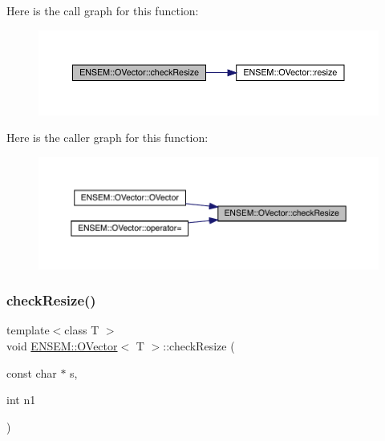 Here is the call graph for this function\+:
\nopagebreak
\begin{figure}[H]
\begin{center}
\leavevmode
\includegraphics[width=350pt]{d0/d8d/classENSEM_1_1OVector_a95545451bb9d6be83ba32ad3dc2dab42_cgraph}
\end{center}
\end{figure}
Here is the caller graph for this function\+:\nopagebreak
\begin{figure}[H]
\begin{center}
\leavevmode
\includegraphics[width=350pt]{d0/d8d/classENSEM_1_1OVector_a95545451bb9d6be83ba32ad3dc2dab42_icgraph}
\end{center}
\end{figure}
\mbox{\label{classENSEM_1_1OVector_a95545451bb9d6be83ba32ad3dc2dab42}} 
\subsubsection{\texorpdfstring{checkResize()}{checkResize()}\hspace{0.1cm}{\footnotesize\ttfamily [2/6]}}
{\footnotesize\ttfamily template$<$class T $>$ \\
void \mbox{\hyperlink{classENSEM_1_1OVector}{E\+N\+S\+E\+M\+::\+O\+Vector}}$<$ T $>$\+::check\+Resize (\begin{DoxyParamCaption}\item[{const char $\ast$}]{s,  }\item[{int}]{n1 }\end{DoxyParamCaption})\hspace{0.3cm}{\ttfamily [inline]}}

